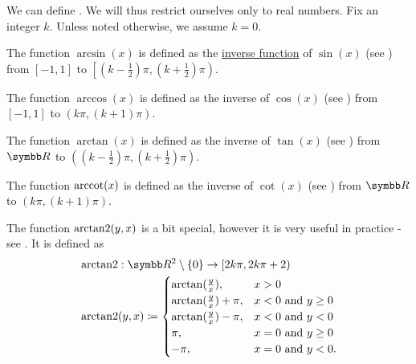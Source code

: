 \begin{definition}\label{def:inverse_trigonometric_functions}
  We can define . We will thus restrict ourselves only to real numbers. Fix an integer \( k \). Unless noted otherwise, we assume \( k = 0 \).

  \begin{DefEnum}
     The  function \( \arcsin(x) \) is defined as the \hyperref[def:function/inverse]{inverse function} of \( \sin(x) \) (see ) from \( [-1, 1] \) to \( \left[(k - \tfrac 1 2) \pi, (k + \tfrac 1 2) \pi \right) \).

     The  function \( \arccos(x) \) is defined as the inverse of \( \cos(x) \) (see ) from \( [-1, 1] \) to \( (k\pi, (k + 1)\pi) \).

     The  function \( \arctan(x) \) is defined as the inverse of \( \tan(x) \) (see ) from \( \BR \) to \( \left((k - \tfrac 1 2) \pi, (k + \tfrac 1 2) \pi \right) \).

     The  function \( \operatorname{arccot}(x) \) is defined as the inverse of \( \cot(x) \) (see ) from \( \BR \) to \( (k\pi, (k + 1)\pi) \).

     The  function \( \operatorname{arctan2}(y, x) \) is a bit special, however it is very useful in practice - see . It is defined as
    \begin{align*}
       & \ATanTwo: \BR^2 \setminus \{ 0 \} \to [2k\pi, 2k\pi + 2) \\
       & \ATanTwo(y, x) \coloneqq \begin{cases}
        \arctan(\tfrac y x),       & x > 0                \\
        \arctan(\tfrac y x) + \pi, & x < 0 \Tand y \geq 0 \\
        \arctan(\tfrac y x) - \pi, & x < 0 \Tand y < 0    \\
        \pi,                       & x = 0 \Tand y \geq 0 \\
        -\pi,                      & x = 0 \Tand y < 0.
      \end{cases}
    \end{align*}
  \end{DefEnum}
\end{definition}

